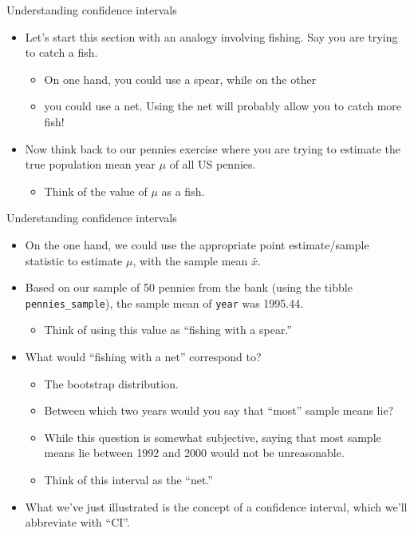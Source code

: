 \documentclass[
  ignorenonframetext,
]{beamer}
\providecommand{\tightlist}{%
  \setlength{\itemsep}{0pt}\setlength{\parskip}{0pt}}
\begin{document}
\begin{frame}{Understanding confidence intervals}
\protect\hypertarget{understanding-confidence-intervals-1}{}
\begin{itemize}
\item
  Let's start this section with an analogy involving fishing. Say you
  are trying to catch a fish.

  \begin{itemize}
  \tightlist
  \item
    On one hand, you could use a spear, while on the other
  \item
    you could use a net. Using the net will probably allow you to catch
    more fish!
  \end{itemize}
\item
  Now think back to our pennies exercise where you are trying to
  estimate the true population mean year \(\mu\) of all US pennies.

  \begin{itemize}
  \tightlist
  \item
    Think of the value of \(\mu\) as a fish.
  \end{itemize}
\end{itemize}
\end{frame}

\begin{frame}[fragile]{Understanding confidence intervals}
\protect\hypertarget{understanding-confidence-intervals-2}{}
\begin{itemize}
\item
  On the one hand, we could use the appropriate point estimate/sample
  statistic to estimate \(\mu\), with the sample mean \(\bar{x}\).
\item
  Based on our sample of 50 pennies from the bank (using the tibble
  \texttt{pennies\_sample}), the sample mean of \texttt{year} was
  1995.44.

  \begin{itemize}
  \tightlist
  \item
    Think of using this value as ``fishing with a spear.''
  \end{itemize}
\item
  What would ``fishing with a net'' correspond to?

  \begin{itemize}
  \tightlist
  \item
    The bootstrap distribution.
  \item
    Between which two years would you say that ``most'' sample means
    lie?
  \item
    While this question is somewhat subjective, saying that most sample
    means lie between 1992 and 2000 would not be unreasonable.
  \item
    Think of this interval as the ``net.''
  \end{itemize}
\item
  What we've just illustrated is the concept of a confidence interval,
  which we'll abbreviate with ``CI''.
\end{itemize}
\end{frame}
\end{document}
